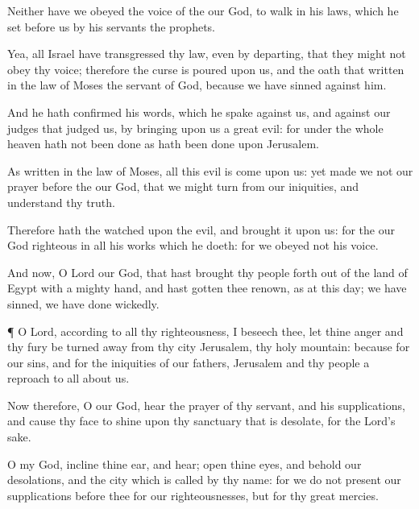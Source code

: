{Neither have we
obeyed the
voice of the
{} our
God, to
walk in his
laws, which he
set
before us
by his
servants the
prophets.

Yea, all
Israel have
transgressed thy
law, even by
departing, that they might not
obey thy
voice; therefore the
curse is
poured upon us, and the
oath that
{}
written in the
law of
Moses the
servant of
God, because we have
sinned against him.

And he hath
confirmed his
words, which he
spake against us, and against our
judges that
judged us, by
bringing upon us a
great
evil: for under the whole
heaven hath not been
done as hath been
done upon
Jerusalem.

As
{}
written in the
law of
Moses, all this
evil is
come upon us: yet made we not our
prayer
before the
{} our
God, that we might
turn from our
iniquities, and
understand thy
truth.

Therefore hath the
{}
watched upon the
evil, and
brought it upon us: for the
{} our
God
{}
righteous in all his
works which he
doeth: for we
obeyed not his
voice.

And now, O
Lord our
God, that hast
brought thy
people
forth out of the
land of
Egypt with a
mighty
hand, and hast
gotten thee
renown, as at this
day; we have
sinned, we have done
wickedly.


\par }{\PP {}¶ O
Lord, according to all thy
righteousness, I beseech thee, let thine
anger and thy
fury be turned
away from thy
city
Jerusalem, thy
holy
mountain: because for our
sins, and for the
iniquities of our
fathers,
Jerusalem and thy
people
{} a
reproach to all
{}
about us.

Now therefore, O our
God,
hear the
prayer of thy
servant, and his
supplications, and cause thy
face to
shine upon thy
sanctuary that is
desolate, for the
Lord’s sake.

O my
God,
incline thine
ear, and
hear;
open thine
eyes, and
behold our
desolations, and the
city which is
called by thy
name: for we do not
present our
supplications
before thee for our
righteousnesses, but for thy
great
mercies.

}
